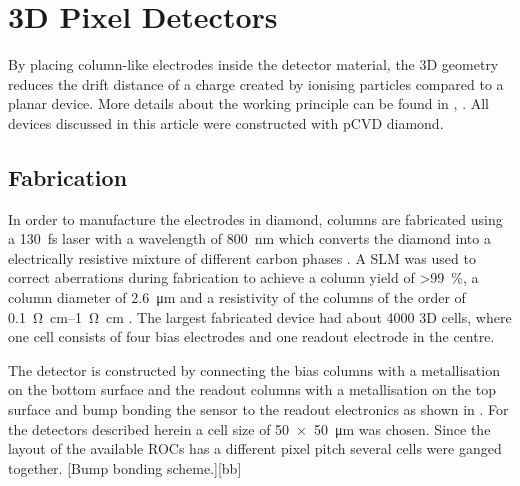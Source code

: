 \section{3D Pixel Detectors}
By placing column-like electrodes inside the detector material, the 3D geometry reduces the drift distance of a charge created by ionising particles compared to a planar device. More details about the working principle can be found in \cite{parker}, \cite{3D}. All devices discussed in this article were constructed with \ac{pCVD} diamond.
\subsection{Fabrication}
In order to manufacture the electrodes in diamond, columns are 
fabricated using a \SI{130}{\femto\second} laser with a wavelength of \SI{800}{\nano\meter} which converts the diamond into a electrically resistive mixture of different carbon phases \cite{3dfab}. A \ac{SLM} was used to correct aberrations during fabrication to achieve a column yield of \SI{>99}{\%}, a column diameter of \SI{2.6}{\micro\meter} and a resistivity of the columns of the order of \SIrange{.1}{1}{\ohm\centi\meter} \cite{slm}. The largest fabricated device had about 4000 3D cells, where one cell consists of four bias electrodes and one readout electrode in the centre. \par
The detector is constructed by connecting the bias columns with a metallisation on the bottom surface and the readout columns with a metallisation on the top surface and bump bonding the sensor to the readout electronics as shown in . For the detectors described herein a cell size of \SI{50x50}{\micro\meter} was chosen. Since the layout of the available \acp{ROC} has a different pixel pitch several cells were ganged together.
[Bump bonding scheme.][bb]
